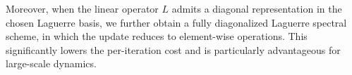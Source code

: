 \documentclass[a4paper,fleqn, 12pt]{cas-sc}
\numberwithin{table}{section}
\begin{document}
Moreover, when the linear operator $L$ admits a diagonal representation in the chosen Laguerre basis, we further obtain a fully diagonalized Laguerre spectral scheme, in which the update reduces to element-wise operations. This significantly lowers the per-iteration cost and is particularly advantageous for large-scale dynamics. 

\end{document}
